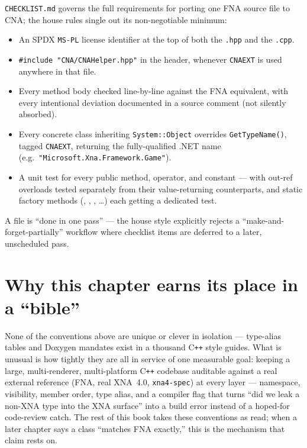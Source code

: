 \texttt{CHECKLIST.md} governs the full requirements for porting one FNA source file to CNA;
the house rules single out its non-negotiable minimum:

\begin{itemize}
  \item An SPDX \texttt{MS-PL} license identifier at the top of both the \texttt{.hpp} and
        the \texttt{.cpp}.
  \item \texttt{\#include "CNA/CNAHelper.hpp"} in the header, whenever \texttt{CNAEXT} is used
        anywhere in that file.
  \item Every method body checked line-by-line against the FNA equivalent, with every
        intentional deviation documented in a source comment (not silently absorbed).
  \item Every concrete class inheriting \texttt{System::Object} overrides
        \texttt{GetTypeName()}, tagged \texttt{CNAEXT}, returning the fully-qualified .NET
        name (e.g.\ \texttt{"Microsoft.Xna.Framework.Game"}).
  \item A unit test for every public method, operator, and constant --- with out-ref
        overloads tested separately from their value-returning counterparts, and static
        factory methods (, ,
        , \ldots) each getting a dedicated test.
\end{itemize}

A file is ``done in one pass'' --- the house style explicitly rejects a
``make-and-forget-partially'' workflow where checklist items are deferred to a later,
unscheduled pass.

\section{Why this chapter earns its place in a ``bible''}

None of the conventions above are unique or clever in isolation --- type-alias tables and
Doxygen mandates exist in a thousand C\texttt{++} style guides. What is unusual is how tightly
they are all in service of one measurable goal: keeping a large, multi-renderer,
multi-platform C\texttt{++} codebase auditable against a real external reference (FNA, real
XNA~4.0, \texttt{xna4-spec}) at every layer --- namespace, visibility, member order, type
alias, and a compiler flag that turns ``did we leak a non-XNA type into the XNA surface''
into a build error instead of a hoped-for code-review catch. The rest of this book takes
these conventions as read; when a later chapter says a class ``matches FNA exactly,'' this is
the mechanism that claim rests on.
